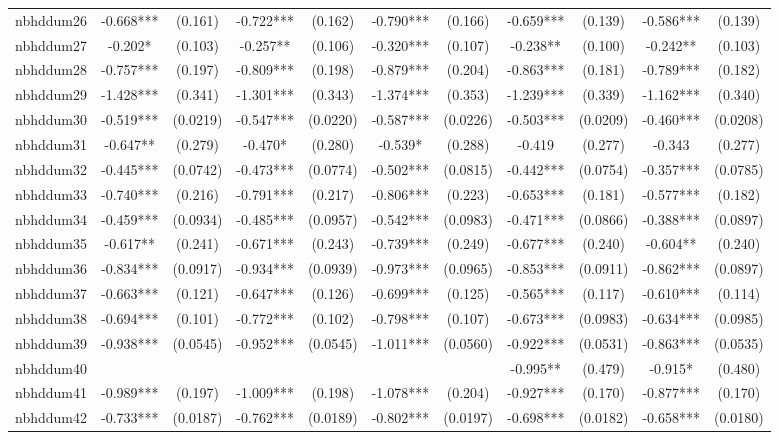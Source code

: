 \documentclass[]{article}
\begin{document}
\begin{tabular}{lcccccccccc}
nbhddum26 & -0.668*** & (0.161) & -0.722*** & (0.162) & -0.790*** & (0.166) & -0.659*** & (0.139) & -0.586*** & (0.139) \\
nbhddum27 & -0.202* & (0.103) & -0.257** & (0.106) & -0.320*** & (0.107) & -0.238** & (0.100) & -0.242** & (0.103) \\
nbhddum28 & -0.757*** & (0.197) & -0.809*** & (0.198) & -0.879*** & (0.204) & -0.863*** & (0.181) & -0.789*** & (0.182) \\
nbhddum29 & -1.428*** & (0.341) & -1.301*** & (0.343) & -1.374*** & (0.353) & -1.239*** & (0.339) & -1.162*** & (0.340) \\
nbhddum30 & -0.519*** & (0.0219) & -0.547*** & (0.0220) & -0.587*** & (0.0226) & -0.503*** & (0.0209) & -0.460*** & (0.0208) \\
nbhddum31 & -0.647** & (0.279) & -0.470* & (0.280) & -0.539* & (0.288) & -0.419 & (0.277) & -0.343 & (0.277) \\
nbhddum32 & -0.445*** & (0.0742) & -0.473*** & (0.0774) & -0.502*** & (0.0815) & -0.442*** & (0.0754) & -0.357*** & (0.0785) \\
nbhddum33 & -0.740*** & (0.216) & -0.791*** & (0.217) & -0.806*** & (0.223) & -0.653*** & (0.181) & -0.577*** & (0.182) \\
nbhddum34 & -0.459*** & (0.0934) & -0.485*** & (0.0957) & -0.542*** & (0.0983) & -0.471*** & (0.0866) & -0.388*** & (0.0897) \\
nbhddum35 & -0.617** & (0.241) & -0.671*** & (0.243) & -0.739*** & (0.249) & -0.677*** & (0.240) & -0.604** & (0.240) \\
nbhddum36 & -0.834*** & (0.0917) & -0.934*** & (0.0939) & -0.973*** & (0.0965) & -0.853*** & (0.0911) & -0.862*** & (0.0897) \\
nbhddum37 & -0.663*** & (0.121) & -0.647*** & (0.126) & -0.699*** & (0.125) & -0.565*** & (0.117) & -0.610*** & (0.114) \\
nbhddum38 & -0.694*** & (0.101) & -0.772*** & (0.102) & -0.798*** & (0.107) & -0.673*** & (0.0983) & -0.634*** & (0.0985) \\
nbhddum39 & -0.938*** & (0.0545) & -0.952*** & (0.0545) & -1.011*** & (0.0560) & -0.922*** & (0.0531) & -0.863*** & (0.0535) \\
nbhddum40 &  &  &  &  &  &  & -0.995** & (0.479) & -0.915* & (0.480) \\
nbhddum41 & -0.989*** & (0.197) & -1.009*** & (0.198) & -1.078*** & (0.204) & -0.927*** & (0.170) & -0.877*** & (0.170) \\
nbhddum42 & -0.733*** & (0.0187) & -0.762*** & (0.0189) & -0.802*** & (0.0197) & -0.698*** & (0.0182) & -0.658*** & (0.0180) \\

\end{tabular}
\end{document}
